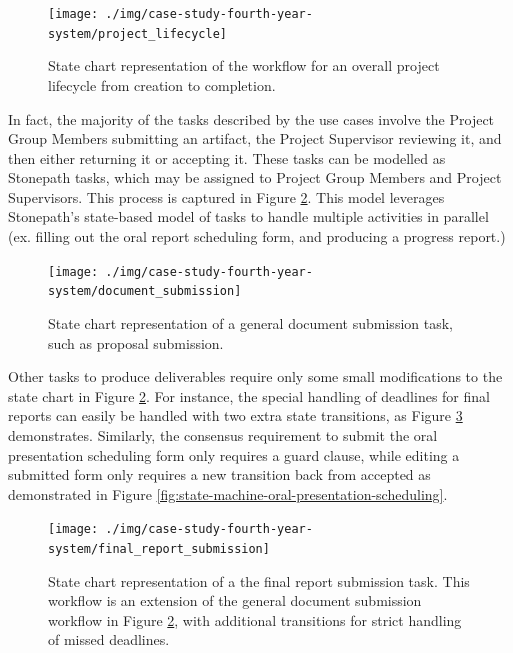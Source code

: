 \begin{figure}[!htbp]
\centering \texttt{[image: ./img/case-study-fourth-year-system/project\_lifecycle]}
\caption{State chart representation of the workflow for an overall project lifecycle from creation to completion.}
\label{fig:state-machine-project-lifecycle}
\end{figure}

In fact, the majority of the tasks described by the use cases involve the Project Group Members submitting an artifact, the Project Supervisor reviewing it, and then either returning it or accepting it. These tasks can be modelled as Stonepath tasks, which may be assigned to Project Group Members and Project Supervisors. This process is captured in Figure \ref{fig:state-machine-document-submission}. This model leverages Stonepath’s state-based model of tasks to handle multiple activities in parallel (ex. filling out the oral report scheduling form, and producing a progress report.)

\begin{figure}[!htbp]
\centering \texttt{[image: ./img/case-study-fourth-year-system/document\_submission]}
\caption{State chart representation of a general document submission task, such as proposal submission.}
\label{fig:state-machine-document-submission}
\end{figure}

Other tasks to produce deliverables require only some small modifications to the state chart in Figure \ref{fig:state-machine-document-submission}. For instance, the special handling of deadlines for final reports can easily be handled with two extra state transitions, as Figure \ref{fig:state-machine-final-report-submission} demonstrates. Similarly, the consensus requirement to submit the oral presentation scheduling form only requires a guard clause, while editing a submitted form only requires a new transition back from accepted as demonstrated in Figure \ref{fig:state-machine-oral-presentation-scheduling}.

\begin{figure}[!htbp]
\centering \texttt{[image: ./img/case-study-fourth-year-system/final\_report\_submission]}
\caption{State chart representation of a the final report submission task. This workflow is an extension of the general document submission workflow in Figure \ref{fig:state-machine-document-submission}, with additional transitions for strict handling of missed deadlines.}
\label{fig:state-machine-final-report-submission}
\end{figure}


